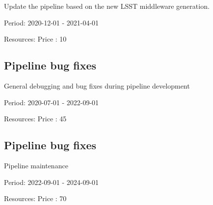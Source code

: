Update the pipeline based on the new LSST middleware generation.

Period: 2020-12-01 - 2021-04-01

Resources: Price : 10

\subsection{Pipeline bug fixes}

General debugging and bug fixes during pipeline development

Period: 2020-07-01 - 2022-09-01

Resources: Price : 45

\subsection{Pipeline bug fixes}

Pipeline maintenance

Period: 2022-09-01 - 2024-09-01

Resources: Price : 70

